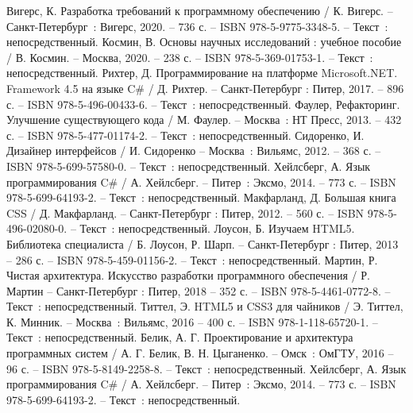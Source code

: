 
\begin{thebibliography}{9}

     Вигерс, К. Разработка требований к программному обеспечению / К. Вигерс. – Санкт-Петербург~: Вигерс, 2020. – 736 с. – ISBN 978-5-9775-3348-5. – Текст~: непосредственный.
     Космин, В. Основы научных исследований : учебное пособие / В. Космин. – Москва, 2020. – 238 с. – ISBN 978-5-369-01753-1. – Текст~: непосредственный.
     Рихтер, Д. Программирование на платформе Microsoft.NET. Framework 4.5 на языке C\# / Д. Рихтер. – Санкт-Петербург : Питер, 2017. – 896 с. – ISBN 978-5-496-00433-6. – Текст~: непосредственный.
    	Фаулер, Рефакторинг. Улучшение существующего кода / М. Фаулер. – Москва~: НТ Пресс, 2013. – 432 с. – ISBN 978-5-477-01174-2. – Текст~: непосредственный.
		Сидоренко, И. Дизайнер интерфейсов / И.	Сидоренко – Москва~: Вильямс, 2012. – 368 с. – ISBN 978-5-699-57580-0. – Текст~: непосредственный.
		Хейлсберг, А. Язык программирования C\# / А. Хейлсберг. – Питер~: Эксмо, 2014. – 773 с. – ISBN 978-5-699-64193-2. – Текст~: непосредственный.
		Макфарланд, Д. Большая книга CSS / Д. Макфарланд. – Санкт-Петербург : Питер, 2012. – 560 с. – ISBN 978-5-496-02080-0. – Текст~: непосредственный.
		Лоусон, Б. Изучаем HTML5. Библиотека специалиста / Б. Лоусон, Р. Шарп. – Санкт-Петербург : Питер, 2013 – 286 с. – ISBN 978-5-459-01156-2. – Текст~: непосредственный.
		Мартин, Р. Чистая архитектура. Искусство разработки программного обеспечения / Р. Мартин – Санкт-Петербург : Питер, 2018 – 352 с. – ISBN 978-5-4461-0772-8. – Текст~: непосредственный.    
		Титтел, Э. HTML5 и CSS3 для чайников / Э. Титтел, К. Минник. – Москва~: Вильямс, 2016 – 400 с. – ISBN 978-1-118-65720-1. – Текст~: непосредственный.    
		Белик, А. Г. Проектирование и архитектура программных систем / А. Г.  Белик, В. Н. Цыганенко. – Омск~: ОмГТУ, 2016 – 96 с. – ISBN 978-5-8149-2258-8. – Текст~: непосредственный.	
		Хейлсберг, А. Язык программирования C\# / А. Хейлсберг. – Питер~: Эксмо, 2014. – 773 с. – ISBN 978-5-699-64193-2. – Текст~: непосредственный.
\end{thebibliography}
